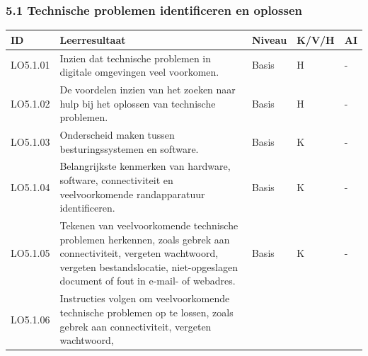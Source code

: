\documentclass[
  dutch,
  letterpaper,
  DIV=11,
  numbers=noendperiod]{scrartcl}
\begin{document}
\subsubsection{5.1 Technische problemen identificeren en
oplossen}\label{technische-problemen-identificeren-en-oplossen}

\begin{longtable}[]{@{}
  >{\centering\arraybackslash}p{}
  >{\centering\arraybackslash}p{}
  >{\centering\arraybackslash}p{}
  >{\centering\arraybackslash}p{}
  >{\centering\arraybackslash}p{}@{}}
\toprule\noalign{}
\begin{minipage}[b]{\linewidth}\centering
ID
\end{minipage} & \begin{minipage}[b]{\linewidth}\centering
Leerresultaat
\end{minipage} & \begin{minipage}[b]{\linewidth}\centering
Niveau
\end{minipage} & \begin{minipage}[b]{\linewidth}\centering
K/V/H
\end{minipage} & \begin{minipage}[b]{\linewidth}\centering
AI
\end{minipage} \\
\midrule\noalign{}
\endhead
\bottomrule\noalign{}
\endlastfoot
LO5.1.01 & Inzien dat technische problemen in digitale omgevingen veel
voorkomen. & Basis & H & - \\
LO5.1.02 & De voordelen inzien van het zoeken naar hulp bij het oplossen
van technische problemen. & Basis & H & - \\
LO5.1.03 & Onderscheid maken tussen besturingssystemen en software. &
Basis & K & - \\
LO5.1.04 & Belangrijkste kenmerken van hardware, software,
connectiviteit en veelvoorkomende randapparatuur identificeren. & Basis
& K & - \\
LO5.1.05 & Tekenen van veelvoorkomende technische problemen herkennen,
zoals gebrek aan connectiviteit, vergeten wachtwoord, vergeten
bestandslocatie, niet-opgeslagen document of fout in e-mail- of
webadres. & Basis & K & - \\
LO5.1.06 & Instructies volgen om veelvoorkomende technische problemen op
te lossen, zoals gebrek aan connectiviteit, vergeten wachtwoord,

\end{longtable}
\end{document}
